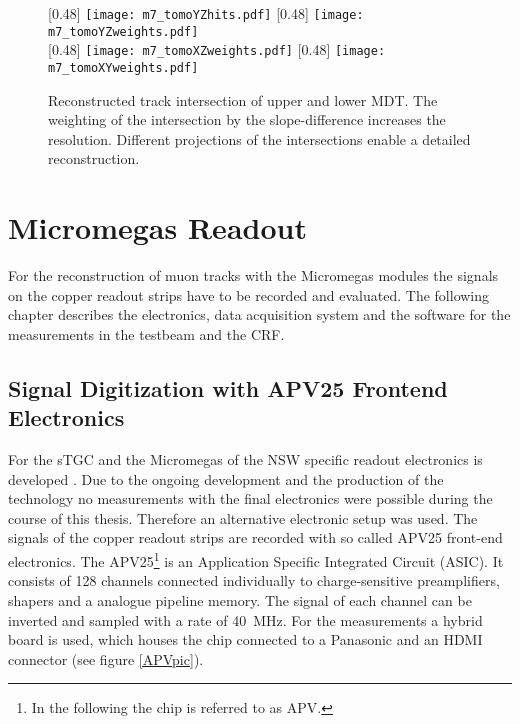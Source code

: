 \documentclass[
twoside,            %
BCOR1.4cm,          %
10pt,               %
headings=normal,    %
headsepline,        %
clearplainpage,		%
final,              %
div=14,
open=right,
bibliography=toc
]{scrreprt}
\begin{document}
\begin{figure}[!h]
	\centering
	[0.48\textwidth]
	{\texttt{[image: m7\_tomoYZhits.pdf]}}
	\hfill
	[0.48\textwidth]
	{\texttt{[image: m7\_tomoYZweights.pdf]}}
	\\
	[0.48\textwidth]
	{\texttt{[image: m7\_tomoXZweights.pdf]}}
	\hfill
	[0.48\textwidth]
	{\texttt{[image: m7\_tomoXYweights.pdf]}}
	\vspace{-2mm}
	\caption{
		Reconstructed track intersection of upper and lower MDT.
		The weighting of the intersection by the slope-difference increases the resolution.
		Different projections of the intersections enable a detailed reconstruction.
	}
	\label{m7_tomography}
\end{figure}

\section{Micromegas Readout}

For the reconstruction of muon tracks with the Micromegas modules the signals on the copper readout strips have to be recorded and evaluated.
The following chapter describes the electronics, data acquisition system and the software for the measurements in the testbeam and the CRF.

\subsection{Signal Digitization with APV25 Frontend Electronics}\label{APV25electronics}

For the sTGC and the Micromegas of the NSW specific readout electronics is developed \cite{VMM}.
Due to the ongoing development and the production of the technology no measurements with the final electronics were possible during the course of this thesis.
Therefore an alternative electronic setup was used.
The signals of the copper readout strips are recorded with so called APV25 \cite{APV} front-end electronics.
The APV25\footnote{
	In the following the chip is referred to as APV.
} is an Application Specific Integrated Circuit (ASIC).
It consists of 128 channels connected individually to charge-sensitive preamplifiers, shapers and a analogue pipeline memory.
The signal of each channel can be inverted and sampled with a rate of \SI{40}{MHz}.
For the measurements a hybrid board is used, which houses the chip connected to a Panasonic and an HDMI connector (see figure \ref{APVpic}).
\end{document}
